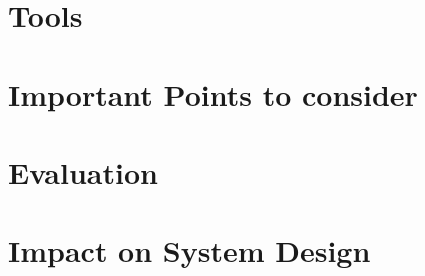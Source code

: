 \section{Tools}

\section{Important Points to consider}

\section{Evaluation}

\section{Impact on System Design}